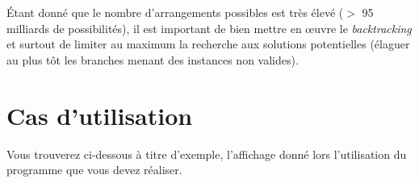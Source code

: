 \documentclass[10pt]{article}
\begin{document}
\'Etant donné que le nombre d'arrangements possibles est très élevé
($>$ 95 milliards de possibilités), il est important de bien mettre en
\oe uvre le \emph{backtracking} et surtout de limiter au maximum la recherche aux solutions potentielles (élaguer au plus tôt les branches menant des instances non valides).




\newpage
\section*{Cas d'utilisation}

Vous trouverez ci-dessous à titre d'exemple, l'affichage donné lors l'utilisation du programme que vous devez réaliser.

\end{document}
